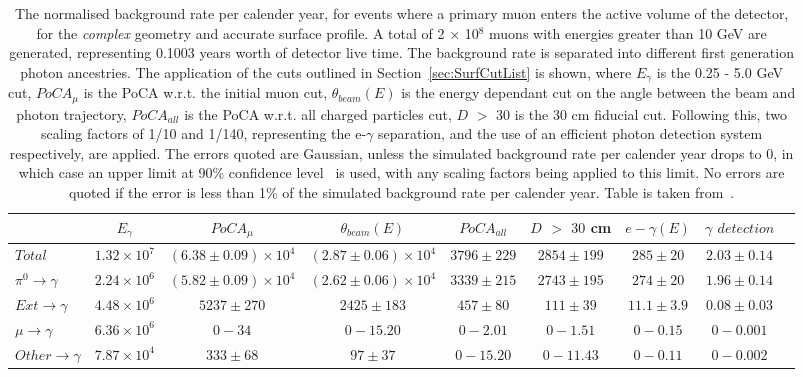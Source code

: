 \begin{table}
  \caption[The normalised background rate per calender year, for events where a primary muon enters the active volume of the detector, for the \emph{complex} geometry and accurate surface profile]
          {The normalised background rate per calender year, for events where a primary muon enters the active volume of the detector, for the \emph{complex} geometry and accurate surface profile. A total of 2 $\times$ 10$^8$ muons with energies greater than 10 GeV are generated, representing 0.1003 years worth of detector live time. The background rate is separated into different first generation photon ancestries. The application of the cuts outlined in Section~\ref{sec:SurfCutList} is shown, where $E_\gamma$ is the 0.25 - 5.0 GeV cut, $PoCA_\mu$ is the PoCA w.r.t. the initial muon cut, $\theta_{beam}(E)$ is the energy dependant cut on the angle between the beam and photon trajectory, $PoCA_{all}$ is the PoCA w.r.t. all charged particles cut, $D$ $>$ $30$ is the 30 cm fiducial cut. Following this, two scaling factors of 1/10 and 1/140, representing the e-$\gamma$ separation, and the use of an efficient photon detection system respectively, are applied. The errors quoted are Gaussian, unless the simulated background rate per calender year drops to 0, in which case an upper limit at 90\% confidence level~\citep{PhysRevD.57.3873} is used, with any scaling factors being applied to this limit. No errors are quoted if the error is less than 1\% of the simulated background rate per calender year. Table is taken from~\citep{MartinsThesis}.}
  \label{tab:SurfMuComp}
  \centering
  \scriptsize
  \begin{tabular}{l c c c c c c c c }
    \toprule
        & $E_\gamma$ & $PoCA_\mu$ & $\theta_{beam}(E)$ & $PoCA_{all}$ & $D$ $>$ $30$ cm & $e-\gamma(E)$ & $\gamma$ $detection$ \\
        \midrule
        $Total$          & $1.32\times10^7$ & $(6.38\pm0.09)\times10^4$ & $(2.87\pm0.06)\times10^4$ & $3796\pm229$ & $2854\pm199$ & $285\pm20$   & $2.03\pm0.14$ \\

        $\pi^0\to\gamma$ & $2.24\times10^6$ & $(5.82\pm0.09)\times10^4$ & $(2.62\pm0.06)\times10^4$ & $3339\pm215$ & $2743\pm195$ & $274\pm20$   & $1.96\pm0.14$ \\

        $Ext\to\gamma$   & $4.48\times10^6$ & $5237\pm270$              & $2425\pm183$              & $457\pm80$   & $111\pm39$   & $11.1\pm3.9$ & $0.08\pm0.03$ \\

        $\mu\to\gamma$   & $6.36\times10^6$ & $0-34$                    & $0-15.20$                 & $0-2.01$     & $0-1.51$     & $0-0.15$     & $0-0.001$ \\

        $Other\to\gamma$ & $7.87\times10^4$ & $333\pm68$                & $97\pm37$                 & $0-15.20$    & $0-11.43$    & $0-0.11$     & $0-0.002$ \\
        \bottomrule
  \end{tabular}
\end{table}

